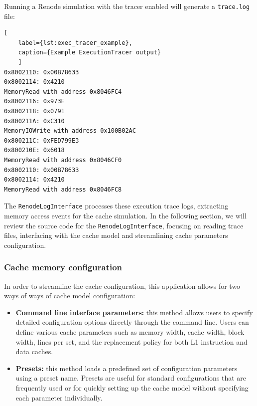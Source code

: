 \noindent Running a Renode simulation with the tracer enabled will generate a \texttt{trace.log} file:
\begin{center}
\centering
\begin{minipage}{\linewidth}
\begin{lstlisting}[
    label={lst:exec_tracer_example},
    caption={Example ExecutionTracer output}
    ]
0x8002110: 0x00B78633
0x8002114: 0x4210
MemoryRead with address 0x8046FC4
0x8002116: 0x973E
0x8002118: 0x0791
0x800211A: 0xC310
MemoryIOWrite with address 0x100B02AC
0x800211C: 0xFED799E3
0x800210E: 0x6018
MemoryRead with address 0x8046CF0
0x8002110: 0x00B78633
0x8002114: 0x4210
MemoryRead with address 0x8046FC8
\end{lstlisting}
\end{minipage}
\end{center}

\noindent The \texttt{RenodeLogInterface} processes these execution trace logs, extracting memory access events for the cache simulation. In the following section, we will review %
the source code for the \texttt{RenodeLogInterface}, focusing on reading trace files, interfacing with the cache model and streamlining cache parameters configuration.

\subsubsection*{Cache memory configuration}

In order to streamline the cache configuration, this application allows for two ways of ways of cache model configuration:
\begin{itemize}
    \item \textbf{Command line interface parameters:} this method allows users to specify detailed configuration options directly through the command line. Users can define various
        cache parameters such as memory width, cache width, block width, lines per set, and the replacement policy for both L1 instruction and data caches.
    \item \textbf{Presets:} this method loads a predefined set of configuration parameters using a preset name. Presets are useful for standard configurations that are frequently used or
        for quickly setting up the cache model without specifying each parameter individually.
\end{itemize}

